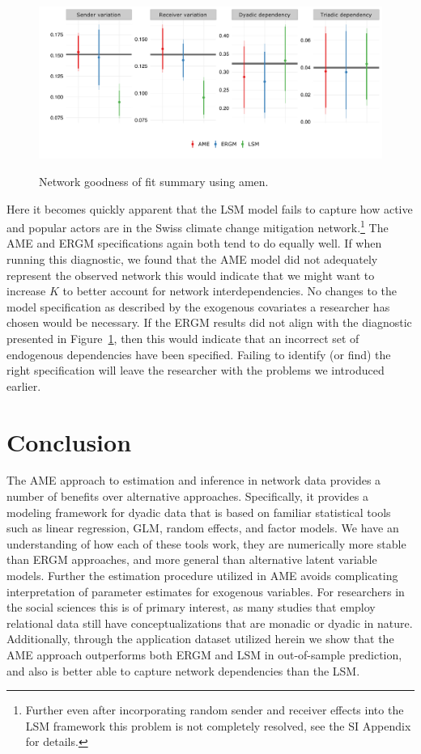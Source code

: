 \documentclass[12pt,pdflatex]{elsarticle}
\newcommand{\pkg}[1]{{\fontseries{b}\selectfont #1}}
\begin{document}
\begin{figure}[ht]
	\centering
	\caption{Network goodness of fit summary using \pkg{amen}.}
	\includegraphics[width=1\textwidth]{netPerfCoef}
	\label{fig:ergmAmePerf}
\end{figure}
\FloatBarrier

Here it becomes quickly apparent that the LSM model fails to capture how active and popular actors are in the Swiss climate change mitigation network.\footnote{Further even after incorporating random sender and receiver effects into the LSM framework this problem is not completely resolved, see the SI Appendix for details.} The AME and ERGM specifications again both tend to do equally well. If when running this diagnostic, we found that the AME model did not adequately represent the observed network this would indicate that we might want to increase $K$ to better account for network interdependencies. No changes to the model specification as described by the exogenous covariates a researcher has chosen would be necessary. If the ERGM results did not align with the diagnostic presented in Figure~\ref{fig:ergmAmePerf}, then this would indicate that an incorrect set of endogenous dependencies have been specified. Failing to identify (or find) the right specification will leave the researcher with the problems we introduced earlier.

\section*{\textbf{Conclusion}}

The AME approach to estimation and inference in network data provides a number of benefits over alternative approaches. Specifically, it provides a modeling framework for dyadic data that is based on familiar statistical tools such as linear regression, GLM, random effects, and factor models. We have an understanding of how each of these tools work, they are numerically more stable than ERGM approaches, and more general than alternative latent variable models. Further the estimation procedure utilized in AME avoids complicating interpretation of parameter estimates for exogenous variables. For researchers in the social sciences this is of primary interest, as many studies that employ relational data still have conceptualizations that are monadic or dyadic in nature. Additionally, through the application dataset utilized herein we show that the AME approach outperforms both ERGM and LSM in out-of-sample prediction, and also is better able to capture network dependencies than the LSM.
\end{document}
